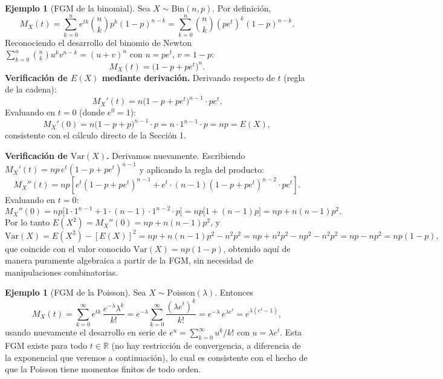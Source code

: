 \documentclass[11pt,a4paper]{article}
\theoremstyle{plain}
\theoremstyle{definition}
\newtheorem{ejemplo}[teorema]{Ejemplo}
\theoremstyle{remark}
\begin{document}
\begin{ejemplo}[FGM de la binomial]
Sea $X\sim\text{Bin}(n,p)$. Por definición,
\[
M_X(t) = \sum_{k=0}^n e^{tk}\binom{n}{k}p^k(1-p)^{n-k} = \sum_{k=0}^n \binom{n}{k}(pe^t)^k(1-p)^{n-k}.
\]
Reconociendo el desarrollo del binomio de Newton $\sum_{k=0}^n \binom{n}{k}u^k v^{n-k}=(u+v)^n$ con $u=pe^t$, $v=1-p$:
\[
M_X(t) = \big(1-p+pe^t\big)^n.
\]
\textbf{Verificación de $E(X)$ mediante derivación.} Derivando respecto de $t$ (regla de la cadena):
\[
M_X'(t) = n\big(1-p+pe^t\big)^{n-1}\cdot pe^t.
\]
Evaluando en $t=0$ (donde $e^0=1$):
\[
M_X'(0) = n\big(1-p+p\big)^{n-1}\cdot p = n\cdot 1^{n-1}\cdot p = np = E(X),
\]
consistente con el cálculo directo de la Sección 1.

\textbf{Verificación de $\text{Var}(X)$.} Derivamos nuevamente. Escribiendo $M_X'(t)=np\,e^t(1-p+pe^t)^{n-1}$ y aplicando la regla del producto:
\[
M_X''(t) = np\left[e^t(1-p+pe^t)^{n-1} + e^t\cdot(n-1)(1-p+pe^t)^{n-2}\cdot pe^t\right].
\]
Evaluando en $t=0$:
\[
M_X''(0) = np\big[1\cdot 1^{n-1} + 1\cdot(n-1)\cdot 1^{n-2}\cdot p\big] = np\big[1+(n-1)p\big] = np + n(n-1)p^2.
\]
Por lo tanto $E(X^2)=M_X''(0)=np+n(n-1)p^2$, y
\[
\text{Var}(X) = E(X^2)-[E(X)]^2 = np+n(n-1)p^2 - n^2p^2 = np + n^2p^2-np^2-n^2p^2 = np-np^2 = np(1-p),
\]
que coincide con el valor conocido $\text{Var}(X)=np(1-p)$, obtenido aquí de manera puramente algebraica a partir de la FGM, sin necesidad de manipulaciones combinatorias.
\end{ejemplo}

\begin{ejemplo}[FGM de la Poisson]
Sea $X\sim\text{Poisson}(\lambda)$. Entonces
\[
M_X(t) = \sum_{k=0}^\infty e^{tk}\,\frac{e^{-\lambda}\lambda^k}{k!} = e^{-\lambda}\sum_{k=0}^\infty \frac{(\lambda e^t)^k}{k!} = e^{-\lambda}\, e^{\lambda e^t} = e^{\lambda(e^t-1)},
\]
usando nuevamente el desarrollo en serie de $e^u=\sum_{k=0}^\infty u^k/k!$ con $u=\lambda e^t$. Esta FGM existe para todo $t\in\mathbb{R}$ (no hay restricción de convergencia, a diferencia de la exponencial que veremos a continuación), lo cual es consistente con el hecho de que la Poisson tiene momentos finitos de todo orden.
\end{ejemplo}
\end{document}

